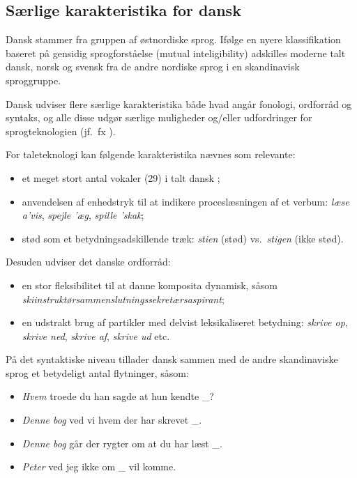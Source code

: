 \begin{multicols}{2}
\subsection{S\ae rlige karakteristika for dansk}

 Dansk stammer fra gruppen af \o stnordiske sprog. If\o lge en nyere klassifikation baseret \mbox{p\aa} gensidig sprogforst\aa else (mutual inteligibility) adskilles moderne talt dansk, norsk og svensk fra de andre nordiske sprog i en skandinavisk sproggruppe. 
 
Dansk udviser flere s\ae rlige karakteristika b\aa de hvad ang\aa r fonologi, ordforr\aa d og syntaks, og alle disse udg\o r s\ae rlige muligheder og/eller udfordringer for sprogtek\-nologien (jf.\ fx \cite{Gregersen, Hellan, Braasch}).


For taleteknologi kan f\o lgende karakteristika n\ae vnes som relevante:
\begin{itemize}
\item 	et meget stort antal vokaler (29) i talt dansk \cite{dansk};
\item 	anvendelsen af enhedstryk til at indikere procesl\ae sningen af et verbum: {\it l\ae se a'vis}, {\it spejle '\ae g}, {\it spille 'skak};
\item 	st\o d som et betydningsadskillende tr\ae k: {\it stien} (st\o d) vs.\ {\it stigen} (ikke st\o d).
\end{itemize}
Desuden udviser det danske ordforr\aa d:
\begin{itemize}
\item 	en stor fleksibilitet til at danne komposita dynamisk, s\aa som {\it skiinstrukt\o rsammenslut\-nings\-sekret\ae rs\-as\-pirant};
\item 	en udstrakt brug af partikler med delvist leksikali\-seret betydning: {\it skrive op}, {\it skrive ned}, {\it skrive af}, {\it skrive ud} etc.
\end{itemize}
\mbox{P\aa} det syntaktiske niveau tillader dansk sammen med de andre skandinaviske sprog et betydeligt antal flytninger, s\aa som:
\begin{itemize}
\item {\it Hvem} troede du han sagde at hun kendte \_?
\item {\it Denne bog} ved vi hvem der har skrevet \_.
\item {\it Denne bog} g\aa r der rygter om at du har l\ae st \_. 
\item {\it Peter} ved jeg ikke om \_ vil komme.
\end{itemize}


\end{multicols}
